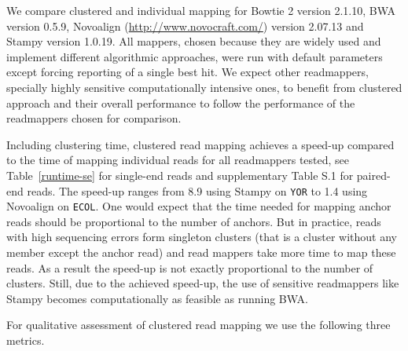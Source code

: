 \documentclass[a4paper]{article}
\begin{document}
We compare clustered and individual mapping for Bowtie 2
\cite{Langmead2012} version 2.1.10, BWA \cite{Li15072009} version 0.5.9,
Novoalign (\url{http://www.novocraft.com/}) version 2.07.13 and
Stampy \cite{Lunter2011} version 1.0.19.
All mappers, chosen because they are widely used and implement different
algorithmic approaches, were run with default parameters except forcing
reporting of a single best hit. We expect other readmappers, specially highly sensitive
computationally intensive ones, to benefit from clustered approach and their overall performance to
follow the performance of the readmappers chosen for comparison.

Including clustering time, clustered read mapping achieves a speed-up
compared to the time of mapping individual reads for all readmappers
tested, see Table~\ref{runtime-se} for single-end reads and supplementary Table S.1 for paired-end reads. The speed-up ranges from
8.9 using Stampy on {\tt YOR} to 1.4 using Novoalign on {\tt ECOL}.
One would expect that the time needed for mapping anchor reads should
be proportional to the number of anchors. But in practice, reads
with
high sequencing errors form singleton clusters (that
is a cluster without any member except the anchor read) and read
mappers take more time to map these reads.  As a result the speed-up is
not exactly proportional to the number of clusters. Still, due to the achieved
speed-up, the use of sensitive readmappers
like Stampy becomes computationally as feasible as running BWA.

For qualitative assessment of clustered read mapping we use the following
three metrics.
\end{document}
